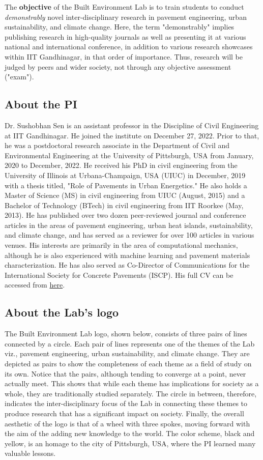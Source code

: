 \documentclass[12pt]{article}
\begin{document}
The \textbf{objective} of the Built Environment Lab is to train students to conduct \textit{demonstrably} novel inter-disciplinary research in pavement engineering, urban sustainability, and climate change. Here, the term "demonstrably" implies publishing research in high-quality journals as well as presenting it at various national and international conference, in addition to various research showcases within IIT Gandhinagar, in that order of importance. Thus, research will be judged by peers and wider society, not through any objective assessment ("exam"). 

\subsection{About the PI}
Dr. Sushobhan Sen is an assistant professor in the Discipline of Civil Engineering at IIT Gandhinagar. He joined the institute on December 27, 2022. Prior to that, he was a postdoctoral research associate in the Department of Civil and Environmental Engineering at the University of Pittsburgh, USA from January, 2020 to December, 2022. He received his PhD in civil engineering from the University of Illinois at Urbana-Champaign, USA (UIUC) in December, 2019 with a thesis titled, "Role of Pavements in Urban Energetics." He also holds a Master of Science (MS) in civil engineering from UIUC (August, 2015) and a Bachelor of Technology (BTech) in civil engineering from IIT Roorkee (May, 2013). He has published over two dozen peer-reviewed journal and conference articles in the areas of pavement engineering, urban heat islands, sustainability, and climate change, and has served as a reviewer for over 100 articles in various venues. His interests are primarily in the area of computational mechanics, although he is also experienced with machine learning and pavement materials characterization. He has also served as Co-Director of Communications for the International Society for Concrete Pavements (ISCP). His full CV can be accessed from \href{https://github.com/sushobhansen/CV/blob/master/sushobhan-sen-cv.pdf}{here}.

\subsection{About the Lab's logo}
The Built Environment Lab logo, shown below, consists of three pairs of lines connected by a circle. Each pair of lines represents one of the themes of the Lab viz., pavement engineering, urban sustainability, and climate change. They are depicted as pairs to show the completeness of each theme as a field of study on its own. Notice that the pairs, although tending to converge at a point, never actually meet. This shows that while each theme has implications for society as a whole, they are traditionally studied separately. The circle in between, therefore, indicates the inter-disciplinary focus of the Lab in connecting these themes to produce research that has a significant impact on society. Finally, the overall aesthetic of the logo is that of a wheel with three spokes, moving forward with the aim of the adding new knowledge to the world. The color scheme, black and yellow, is an homage to the city of Pittsburgh, USA, where the PI learned many valuable lessons. 
\end{document}
